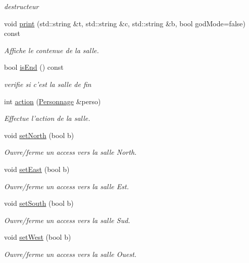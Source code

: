 \begin{DoxyCompactItemize}
\begin{DoxyCompactList}\small\item\em destructeur \end{DoxyCompactList}\item 
void \hyperlink{class_room_a621adfd7a12485b67ba9c26882252830}{print} (std\-::string \&t, std\-::string \&c, std\-::string \&b, bool god\-Mode=false) const 
\begin{DoxyCompactList}\small\item\em Affiche le contenue de la salle. \end{DoxyCompactList}\item 
bool \hyperlink{class_room_a2d04c2be573b64240139ffa96089d0de}{is\-End} () const 
\begin{DoxyCompactList}\small\item\em verifie si c'est la salle de fin \end{DoxyCompactList}\item 
int \hyperlink{class_room_ab4ada24b6e294afb6f5cd7f012caab83}{action} (\hyperlink{class_personnage}{Personnage} \&perso)
\begin{DoxyCompactList}\small\item\em Effectue l'action de la salle. \end{DoxyCompactList}\item 
void \hyperlink{class_room_a1a48c7e2bfa873b36d859eb3471b7400}{set\-North} (bool b)
\begin{DoxyCompactList}\small\item\em Ouvre/ferme un access vers la salle North. \end{DoxyCompactList}\item 
void \hyperlink{class_room_a23e731f42c158963da07fd2022163021}{set\-East} (bool b)
\begin{DoxyCompactList}\small\item\em Ouvre/ferme un access vers la salle Est. \end{DoxyCompactList}\item 
void \hyperlink{class_room_a668be12e9202bb38b09c02d880fabdd6}{set\-South} (bool b)
\begin{DoxyCompactList}\small\item\em Ouvre/ferme un access vers la salle Sud. \end{DoxyCompactList}\item 
void \hyperlink{class_room_a035421048480031e0cde52f1e330025c}{set\-West} (bool b)
\begin{DoxyCompactList}\small\item\em Ouvre/ferme un access vers la salle Ouest. \end{DoxyCompactList}\item 

\end{DoxyCompactItemize}
